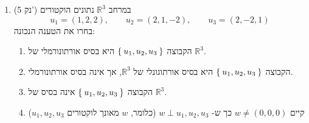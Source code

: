 \documentclass[12pt, a4paper]{article}
\newcommand{\rr}{\mathbb{R}}
\newcommand{\points}[1]{(#1 נק') }
\begin{document}
\begin{enumerate}
\begin{enumerate}
\item
המטריצה המייצגת של
$T$
ביחס לבסיס הסטנדרטי
$\Set{\begin{pmatrix}
    1 \\ 0
\end{pmatrix},
\begin{pmatrix}
    0 \\ 1
\end{pmatrix}
}$
היא
$\begin{pmatrix}
2&1\\
1&-1
\end{pmatrix}$

\item
מתקיים
$T(2,0)=(2,2)$.

\item
ההעתקה
$T$
אינה הפיכה.
\end{enumerate}
\noindent\rule{\textwidth-30pt}{0.4pt}

\item\points{5}
במרחב
$\rr^3$
נתונים הוקטורים
$$u_1=(1,2,2),\qquad u_2=(2,1,-2),\qquad u_3=(2,-2,1)$$
בחרו את הטענה הנכונה:
\begin{enumerate}
\item
הקבוצה
$\Set{u_1,u_2,u_3}$
היא בסיס אורתונורמלי של
$\rr^3$.

\item
הקבוצה
$\Set{u_1,u_2,u_3}$
היא בסיס אורתוגונלי של
$\rr^3$,
אך אינה בסיס אורתונורמלי.

\item
הקבוצה
$\Set{u_1,u_2,u_3}$
אינה בסיס של
$\rr^3$.

\item
קיים
$w\neq (0,0,0)$
כך ש-
$w\perp u_1,u_2,u_3$ (כלומר,
$w$
מאונך לוקטורים
$u_1,u_2,u_3$)
\end{enumerate}

\pagebreak


\end{enumerate}
\end{document}
